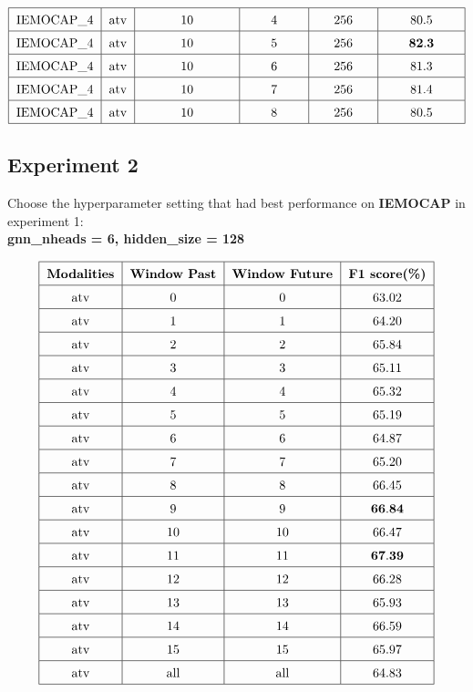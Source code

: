 \documentclass[a4paper]{article}
\begin{document}
\begin{itemize}
\[\begin{tabular}{|c|c|p{2.5cm}<{\centering}|p{1.5cm}<{\centering}|p{1.5cm}<{\centering}|p{2cm}<{\centering}|}
            \hline
            \text{IEMOCAP\_4} & \text{atv} & 10 & 4 & 256 & 80.5 \\
            \hline
            \text{IEMOCAP\_4} & \text{atv} & 10 & 5 & 256 & \(\mathbf{82.3}\) \\
            \hline
            \text{IEMOCAP\_4} & \text{atv} & 10 & 6 & 256 & 81.3 \\
            \hline
            \text{IEMOCAP\_4} & \text{atv} & 10 & 7 & 256 & 81.4 \\
            \hline
            \text{IEMOCAP\_4} & \text{atv} & 10 & 8 & 256 & 80.5 \\
            \hline
        \end{tabular}    
        \]
\end{itemize}

\newpage
\subsection{Experiment 2}
Choose the hyperparameter setting that had best performance on \textbf{IEMOCAP} in experiment 1: 
\\ \noindent \textbf{gnn\_nheads = 6, hidden\_size = 128} 

\[
\renewcommand{\arraystretch}{1.5}
\begin{tabular}{|c|c|c|c|}
    \hline
    \textbf{Modalities} & \textbf{Window Past} & \textbf{Window Future} & \textbf{F1 score(\%)} \\
    \hline
    \text{atv} & 0 & 0 & 63.02 \\
    \hline
    \text{atv} & 1 & 1 & 64.20 \\
    \hline
    \text{atv} & 2 & 2 & 65.84 \\
    \hline
    \text{atv} & 3 & 3 & 65.11 \\
    \hline
    \text{atv} & 4 & 4 & 65.32 \\
    \hline
    \text{atv} & 5 & 5 & 65.19 \\
    \hline
    \text{atv} & 6 & 6 & 64.87 \\
    \hline
    \text{atv} & 7 & 7 & 65.20 \\
    \hline
    \text{atv} & 8 & 8 & 66.45 \\
    \hline
    \text{atv} & 9 & 9 & \(\mathbf{66.84}\) \\
    \hline
    \text{atv} & 10 & 10 & 66.47 \\
    \hline
    \text{atv} & 11 & 11 & \(\mathbf{67.39}\) \\
    \hline
    \text{atv} & 12 & 12 & 66.28 \\
    \hline
    \text{atv} & 13 & 13 & 65.93 \\
    \hline
    \text{atv} & 14 & 14 & 66.59 \\
    \hline
    \text{atv} & 15 & 15 & 65.97 \\
    \hline
    \text{atv} & \text{all} & \text{all} & 64.83 \\
    \hline
\end{tabular}
\]
\end{document}
